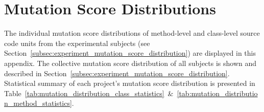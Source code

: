\appendix
\chapter{Mutation Score Distributions}
\label{app:mutation_score_distributions}
The individual mutation score distributions of method-level and class-level source code units from the experimental subjects (see Section~\ref{subsec:experiment_mutation_score_distribution}) are displayed in this appendix. The collective mutation score distribution of all subjects is shown and described in Section~\ref{subsec:experiment_mutation_score_distribution}. Statistical summary of each project's mutation score distribution is presented in Table~\ref{tab:mutation_distribution_class_statistics}~\&~\ref{tab:mutation_distribution_method_statistics}.

